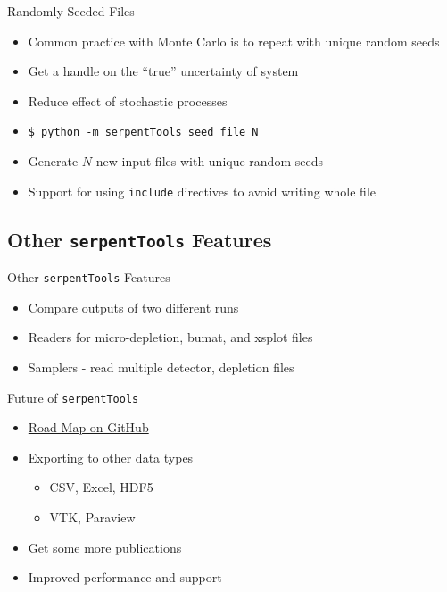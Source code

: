 \documentclass{beamer}
\newcommand{\st}{\texttt{serpentTools} }
\begin{document}
\begin{frame}{Randomly Seeded Files}
    \begin{itemize}
        \item Common practice with Monte Carlo is to repeat with unique random seeds
        \item Get a handle on the ``true'' uncertainty of system
        \item Reduce effect of stochastic processes
        \item \texttt{\$ python -m serpentTools seed file N}
        \item Generate $N$ new input files with unique random seeds
        \item Support for using \texttt{include} directives to avoid writing whole file
    \end{itemize}
\end{frame}

\subsection{Other \st Features}

\begin{frame}{Other \st Features}
    \begin{itemize}
        \item{Compare outputs of two different runs}
        \item{Readers for micro-depletion, bumat, and xsplot files}
        \item{Samplers - read multiple detector, depletion files}
    \end{itemize}
\end{frame}

\begin{frame}{Future of \st}
    \begin{itemize}
        \item{\href{https://github.com/CORE-GATECH-GROUP/serpent-tools/wiki/Road-Map}{Road Map on GitHub}}
        \item{Exporting to other data types}
        \begin{itemize}
            \item{CSV, Excel, HDF5}
            \item{VTK, Paraview}
        \end{itemize}
        \item{Get some more \href{https://github.com/CORE-GATECH-GROUP/serpent-tools/wiki/Publications-using-serpentTools}{publications}}
        \item{Improved performance and support}
    \end{itemize}
\end{frame}
\end{document}
